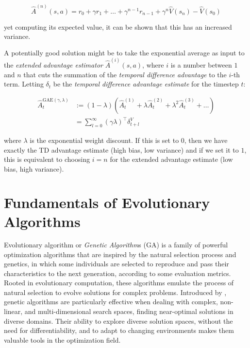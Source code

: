\begin{equation}
    \hat{A} ^{(n)} (s,a) = r _0 + \gamma r _1 + \dots + \gamma ^{n-1} r _{n-1} + \gamma ^n \hat{V}(s _n) - \hat{V}(s _0)
\end{equation}

yet computing its expected value, it can be shown that this has an increased variance.

A potentially good solution might be to take the exponential average as input to the \textit{extended advantage estimator} $\hat{A} ^{(i)}(s, a) $, where $i$ is a number between $1$ and $n$ that cuts the summation of the \textit{temporal difference advantage} to the $i$-th term. Letting $\delta _t$ be the \textit{temporal difference advantage estimate} for the timestep $t$:

\begin{align}
    \hat{A} _t ^{\text{GAE} (\gamma, \lambda)} & := (1 - \lambda)(\hat{A} _t ^{(1)} + \lambda \hat{A} _t ^{(2)} + \lambda ^2 \hat{A} _t ^{(3)} + \dots) \\
                                               & = \sum ^{ \infty } _{l = 0} (\gamma \lambda) ^\top \delta ^V _{t+l} \nonumber
\end{align}

where $\lambda$ is the exponential weight discount. If this is set to $0$, then we have exactly the \ac{TD} advantage estimate (high bias, low variance) and if we set it to $1$, this is equivalent to choosing $i=n$ for the extended advantage estimate (low bias, high variance).

\section{Fundamentals of Evolutionary Algorithms}

Evolutionary algorithm or \textit{Genetic Algorithm}s (\ac{GA}) is a family of powerful optimization algorithms that are inspired by the natural selection
process and genetics, in which some individuals are selected to reproduce and pass their characteristics to the next generation, according to some evaluation metrics. Rooted in evolutionary computation, these algorithms emulate the process of natural selection to evolve solutions for complex problems. Introduced by \citet{holland_1992_ga}, genetic algorithms are particularly effective when dealing with complex, non-linear, and multi-dimensional search spaces, finding near-optimal solutions in diverse domains. Their ability to explore diverse solution spaces, without the need for differentiability, and to adapt to changing environments makes them valuable tools in the optimization field. \citep{katoch_review_2021}

